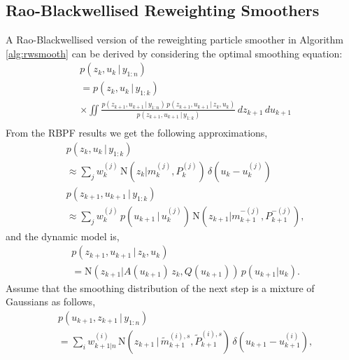 \documentclass[twocolumn]{autart}    %
\begin{document}
\subsection{Rao-Blackwellised Reweighting Smoothers}
%
A Rao-Blackwellised version of the reweighting particle smoother
in Algorithm \ref{alg:rwsmooth} can be derived by considering
the optimal smoothing equation:
%
\begin{equation}
\begin{split}
 &p(z_{k},u_{k} \,|\, y_{1:n}) \\
 &= p(z_{k},u_{k}\,|\,y_{1:k}) \\
 &\times \iint
    \frac{p(z_{k+1},u_{k+1} \,|\, y_{1:n}) \, p(z_{k+1},u_{k+1}\,|\,z_{k},u_{k})}
         {p(z_{k+1},u_{k+1}\,|\,y_{1:k})} \, dz_{k+1} \, du_{k+1} \\
\end{split}
\end{equation}
%
From the RBPF results we get the following approximations,
%
\begin{equation}
\begin{split}
  &p(z_k,u_{k} \,|\, y_{1:k}) \\
  &\approx \sum_j w_k^{(j)} \, \mathrm{N}(z_{k} | m^{(j)}_{k}, P^{(j)}_{k}) \,
    \delta(u_{k} - u_{k}^{(j)}) \\
  &p(z_{k+1},u_{k+1} \,|\, y_{1:k}) \\
  &\approx \sum_j w_k^{(j)} \, p(u_{k+1}\,|\,u_k^{(j)}) \, \mathrm{N}(z_{k+1} | m^{-(j)}_{k+1}, P^{-(j)}_{k+1}),
\end{split}
\end{equation}
%
and the dynamic model is,
%
\begin{equation}
\begin{split}
  &p(z_{k+1},u_{k+1} \,|\, z_{k},u_{k}) \\
  &= \mathrm{N}(z_{k+1} | A(u_{k+1}) \, z_k, Q(u_{k+1})) \, p(u_{k+1} | u_k).
\end{split}
\end{equation}
%
Assume that the smoothing distribution of the next step is a mixture
of Gaussians as follows,
%
\begin{equation}
\begin{split}
  &p(u_{k+1},z_{k+1}\,|\,y_{1:n}) \\
  &=
    \sum_{i} w^{(i)}_{k+1|n} \, \mathrm{N}(z_{k+1}\,|\,\tilde{m}_{k+1}^{(i),s},\tilde{P}_{k+1}^{(i),s}) \,
    \delta(u_{k+1} - u_{k+1}^{(i)}),
\end{split}
\end{equation}
%
\end{document}
